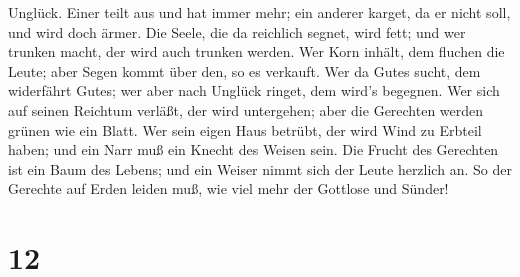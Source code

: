 Unglück.  Einer teilt aus und hat immer mehr; ein anderer
karget, da er nicht soll, und wird doch ärmer.  Die Seele,
die da reichlich segnet, wird fett; und wer trunken macht, der wird auch
trunken werden.  Wer Korn inhält, dem fluchen die Leute;
aber Segen kommt über den, so es verkauft.  Wer da Gutes
sucht, dem widerfährt Gutes; wer aber nach Unglück ringet, dem wird's
begegnen.  Wer sich auf seinen Reichtum verläßt, der wird
untergehen; aber die Gerechten werden grünen wie ein Blatt.
 Wer sein eigen Haus betrübt, der wird Wind zu Erbteil
haben; und ein Narr muß ein Knecht des Weisen sein.  Die
Frucht des Gerechten ist ein Baum des Lebens; und ein Weiser nimmt sich
der Leute herzlich an.  So der Gerechte auf Erden leiden
muß, wie viel mehr der Gottlose und Sünder!

\hypertarget{section-11}{%
\section{12}\label{section-11}}

